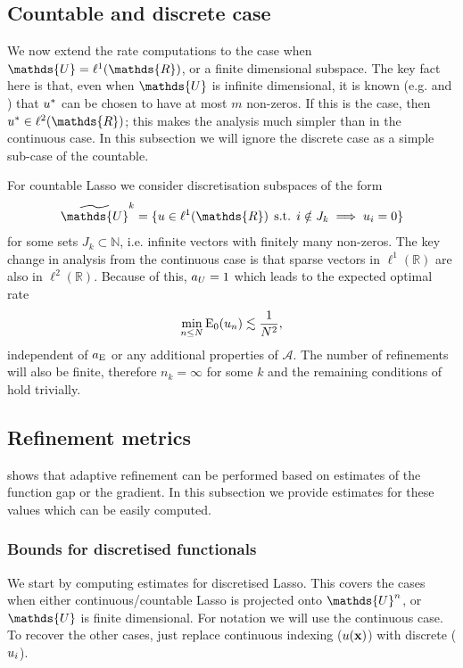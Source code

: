 \documentclass[10pt,a4paper,onecolumn]{article} \usepackage[latin1]{inputenc}
\numberwithin{equation}{section}
\let\F\mathds\let\C\mathcal\newcommand{\R}{\F{R}}\newcommand{\A}{\C{A}}
\newcommand{\op}[1]{\operatorname{#1}}\newcommand{\overtext}[2]{\stackrel{\text{#1}}{#2}}
\DeclareMathOperator{\st}{\;s.t.\;}\DeclareMathOperator{\as}{\;a.s.\;}\renewcommand{\epsilon}{\varepsilon}
\renewcommand{\vec}{\mathbf}
\newcommand{\UCmath}[1]{%
	\begingroup
	\ucmathlist\uppercase\expandafter{#1}%
	\endgroup
}
\newcommand{\ucmathlist}{%
	\def\alpha{\mathrm{A}}%
	\def\beta{\mathrm{B}}%
	\let\gamma=\Gamma
	\let\delta=\Delta
	\def\epsilon{\mathrm{E}}%
	\def\varepsilon{\mathrm{E}}%
	\def\zeta{\mathrm{Z}}%
	\def\eta{\mathrm{H}}%
	\let\theta=\Theta
	\let\vartheta=\Theta
	\def\iota{\mathrm{I}}%
	\def\kappa{\mathrm{K}}%
	\let\lambda=\Lambda
	\def\mu{\mathrm{M}}%
	\def\nu{\mathrm{N}}%
	\let\xi=\Xi
	\let\pi=\Pi
	\let\varpi=\Pi
	\def\rho{\mathrm{P}}%
	\def\varrho{\mathrm{P}}%
	\let\sigma=\Sigma
	\def\tau{\mathrm{T}}%
	\let\upsilon=\Upsilon
	\let\phi=\Phi
	\let\varphi=\Phi
	\def\chi{\mathrm{X}}%
	\let\psi=\Psi
	\let\omega=\Omega
}
\newcommand{\caps}[1]{\UCmath{#1}}
\newcommand*{\Func}[1]{%
	\IfEqCase{#1}{%
		{0}{\op{E}}%
		{1}{\op{F}}%
		{2}{\op{G}}%
		{3}{\op{H}}%
	}[\op{F}#1]%
}
\newcommand*{\varf}[1]{%
	\IfEqCase{#1}{%
		{0}{u}%
		{1}{v}%
		{2}{w}%
	}[u#1]%
}
\newcommand*{\spcf}[1]{%
	\IfEqCase{#1}{%
		{0}{\F{U}}%
		{1}{\F{V}}%
		{2}{\F{W}}%
	}[\F{U}#1]%
}
\newcommand*{\varx}[1]{%
	\IfEqCase{#1}{%
		{0}{x}%
		{1}{y}%
		{2}{z}%
		{3}{r}%
	}[x#1]%
}
\newcommand*{\vars}[1]{%
	\IfEqCase{#1}{%
		{0}{\alpha}%
		{1}{\beta}%
		{2}{\gamma}%
		{3}{a}%
		{4}{b}%
		{5}{c}%
	}[k#1]%
}
\newcommand*{\Varx}[1]{\caps{\varx{#1}}}
\newcommand*{\Varf}[1]{\caps{\varf{#1}}}
\newcommand*{\vvarx}[1]{\vec{\varx{#1}}}\newcommand*{\vVarx}[1]{\vec{\Varx{#1}}}
\begin{document}
\subsection{Countable and discrete case}
We now extend the rate computations to the case when $\spcf0=\ell^1(\R)$, or a finite dimensional subspace. The key fact here is that, even when $\spcf0$ is infinite dimensional, it is known (e.g. \cite[Theorem 2]{Unser2016} and \cite[Corollary 2]{Boyer2019}) that $\varf0^*$ can be chosen to have at most $m$ non-zeros. If this is the case, then $\varf0^*\in \ell^2(\R)$; this makes the analysis much simpler than in the continuous case. In this subsection we will ignore the discrete case as a simple sub-case of the countable.

For countable Lasso we consider discretisation subspaces of the form 
$$\tilde{\spcf0}^k = \{\varf0\in \ell^1(\R) \st i\notin J_k\implies \varf0_i=0\}$$ for some sets $J_k\subset\F N$, i.e. infinite vectors with finitely many non-zeros. The key change in analysis from the continuous case is that sparse vectors in $\ell^1(\R)$ are also in $\ell^2(\R)$. Because of this, $\vars3_{\Varf0}=1$ which leads to the expected optimal rate
$$\min_{n\leq N} \Func0_0(\varf0_n) \lesssim \frac{1}{N^2},$$
independent of $\vars3_{\Func0}$ or any additional properties of $\A$. The number of refinements will also be finite, therefore $n_k=\infty$ for some $k$ and the remaining conditions of  hold trivially.

\subsection{Refinement metrics}\label{sec:ca: Lasso gap and gradient}
 shows that adaptive refinement can be performed based on estimates of the function gap or the gradient. In this subsection we provide estimates for these values which can be easily computed.

\subsubsection{Bounds for discretised functionals}\label{sec:ca: bound discrete}
We start by computing estimates for discretised Lasso. This covers the cases when either continuous/countable Lasso is projected onto $\spcf0^n$, or $\spcf0$ is finite dimensional. For notation we will use the continuous case. To recover the other cases, just replace continuous indexing ($\varf0(\vvarx0)$) with discrete ($\varf0_i$).
\end{document}

